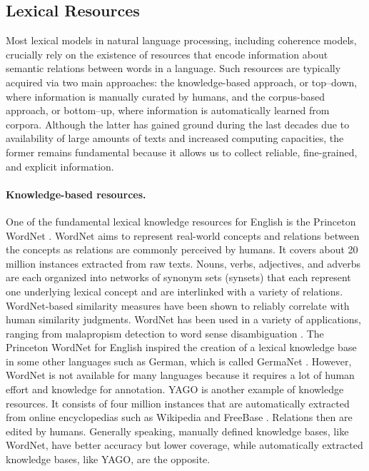 \subsection{Lexical Resources} 

Most lexical models in natural language processing, including coherence models, crucially rely on the existence of resources that encode information about semantic relations between words in a language. 
Such resources are typically acquired via two main approaches: the knowledge-based approach, or top–down, where information is manually curated by humans, and the corpus-based approach, or bottom–up, where information is automatically learned from corpora. 
Although the latter has gained ground during the last decades due to availability of large amounts of texts and increased computing capacities, the former remains fundamental because it allows us to collect reliable, fine-grained, and explicit information. 

\paragraph{Knowledge-based resources.}
One of the fundamental lexical knowledge resources for English is the Princeton WordNet \cite{fellbaum98}.  
WordNet aims to represent real-world concepts and relations between the concepts as relations are commonly perceived by humans. 
It covers about 20 million instances extracted from raw texts. 
Nouns, verbs, adjectives, and adverbs are each organized into networks of synonym sets (synsets) that each represent one underlying lexical concept and are interlinked with a variety of relations. 
WordNet-based similarity measures have been shown to reliably correlate with human similarity judgments. 
WordNet has been used in a variety of applications, ranging from malapropism detection to word sense disambiguation \cite{budanitsky06}.  
The Princeton WordNet for English inspired the creation of a lexical knowledge base in some other languages such as German, which is called GermaNet \cite{hamp97}. 
However, WordNet is not available for many languages because it requires a lot of human effort and knowledge for annotation.  
YAGO \cite{hoffart13} is another example of knowledge resources.  
It consists of four million instances that are automatically extracted from online encyclopedias such as Wikipedia \cite{denoyer06} and FreeBase \cite{bollacker08}. 
Relations then are edited by humans. 
Generally speaking, manually defined knowledge bases, like WordNet, have better accuracy but lower coverage, while automatically extracted knowledge bases, like YAGO, are the opposite. 

